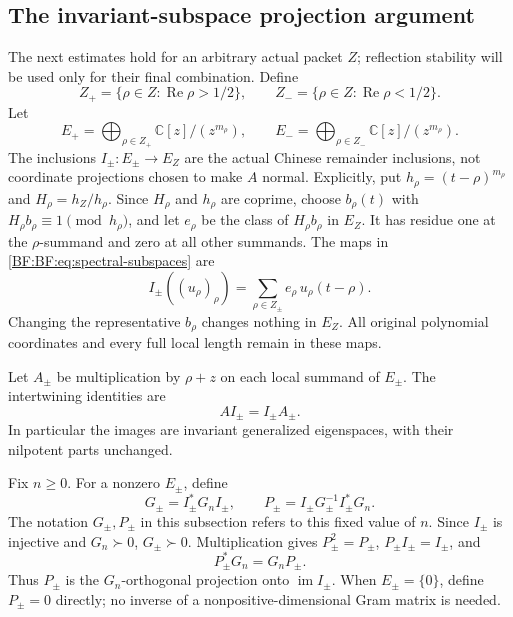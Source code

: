 \subsection{The invariant-subspace projection argument}
\label{BF:BF:projection-proof}

The next estimates hold for an arbitrary actual packet \(Z\);
reflection stability will be used only for their final combination.
Define
\[
Z_+=\{\rho\in Z:\operatorname{Re}\rho>1/2\},\qquad
Z_-=\{\rho\in Z:\operatorname{Re}\rho<1/2\}.
\]
Let
\begin{equation}
E_+=\bigoplus_{\rho\in Z_+}\mathbb C[z]/(z^{m_\rho}),
\qquad
E_-=\bigoplus_{\rho\in Z_-}\mathbb C[z]/(z^{m_\rho}).
\tag{BF.26}\label{BF:BF:eq:spectral-subspaces}
\end{equation}
The inclusions \(I_\pm:E_\pm\to E_Z\) are the actual Chinese
remainder inclusions, not coordinate projections chosen to make
\(A\) normal.  Explicitly, put \(h_\rho=(t-\rho)^{m_\rho}\) and
\(H_\rho=h_Z/h_\rho\).  Since \(H_\rho\) and \(h_\rho\) are coprime,
choose \(b_\rho(t)\) with \(H_\rho b_\rho\equiv1\pmod{h_\rho}\),
and let \(e_\rho\) be the class of \(H_\rho b_\rho\) in \(E_Z\).
It has residue one at the \(\rho\)-summand and zero at all other
summands.  The maps in \eqref{BF:BF:eq:spectral-subspaces} are
\[
I_\pm((u_\rho)_\rho)
 =\sum_{\rho\in Z_\pm}e_\rho\,u_\rho(t-\rho).
\]
Changing the representative \(b_\rho\) changes nothing in \(E_Z\).
All original polynomial coordinates and every full local length
remain in these maps.

Let \(A_\pm\) be multiplication by \(\rho+z\) on each local
summand of \(E_\pm\).  The intertwining identities are
\begin{equation}
AI_\pm=I_\pm A_\pm.
\tag{BF.27}\label{BF:BF:eq:invariant-inclusions}
\end{equation}
In particular the images are invariant generalized eigenspaces, with
their nilpotent parts unchanged.

Fix \(n\ge0\).  For a nonzero \(E_\pm\), define
\begin{equation}
G_\pm=I_\pm^*G_nI_\pm,\qquad
P_\pm=I_\pm G_\pm^{-1}I_\pm^*G_n.
\tag{BF.28}\label{BF:BF:eq:orthogonal-projections}
\end{equation}
The notation \(G_\pm,P_\pm\) in this subsection refers to this
fixed value of \(n\).
Since \(I_\pm\) is injective and \(G_n\succ0\), \(G_\pm\succ0\).
Multiplication gives \(P_\pm^2=P_\pm\),
\(P_\pm I_\pm=I_\pm\), and
\[
P_\pm^*G_n=G_nP_\pm.
\]
Thus \(P_\pm\) is the \(G_n\)-orthogonal projection onto
\(\operatorname{im}I_\pm\).  When \(E_\pm=\{0\}\), define
\(P_\pm=0\) directly; no inverse of a nonpositive-dimensional
Gram matrix is needed.

